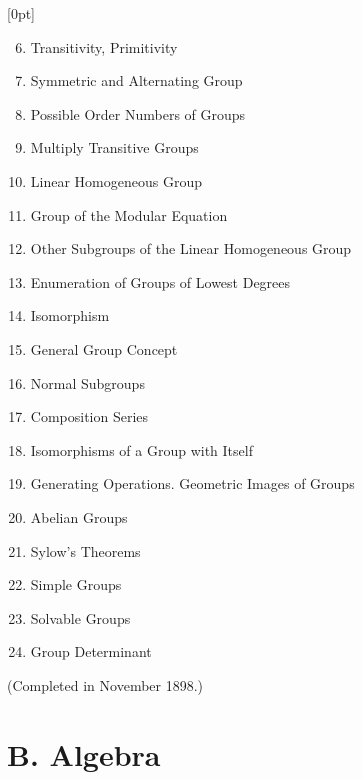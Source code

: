 \thispagestyle{fancy}

\vspace{0.5cm}


[0pt]
  {}
  {\numberline{}\makebox[1.5cm][l]{\thesubsection}}
  {}
  {\contentspage}

\fontsize{6}{0}\selectfont 
\bfseries 

\begin{enumerate}[itemsep=0pt]
    \setcounter{enumi}{5}
    \item Transitivity, Primitivity
    \item Symmetric and Alternating Group
    \item Possible Order Numbers of Groups
    \item Multiply Transitive Groups
    \item Linear Homogeneous Group
    \item Group of the Modular Equation
    \item Other Subgroups of the Linear Homogeneous Group
    \item Enumeration of Groups of Lowest Degrees
    \item Isomorphism
    \item General Group Concept
    \item Normal Subgroups
    \item Composition Series
    \item Isomorphisms of a Group with Itself
    \item Generating Operations. Geometric Images of Groups
    \item Abelian Groups
    \item Sylow's Theorems
    \item Simple Groups
    \item Solvable Groups
    \item Group Determinant
\end{enumerate}

\vspace{-0.1cm}
{\normalfont(Completed in November 1898.)}

\vspace{-0.1cm}
\section*{B. Algebra}

